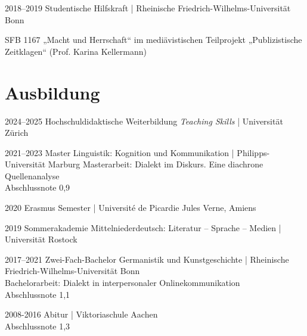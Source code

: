 \documentclass[11pt, a4paper, notopicbreak, titleabove]{simplecv}
\begin{document}
\begin{topic}
	\item[2018--2019]
		Studentische Hilfskraft {\color{SpotColor}|} Rheinische Friedrich-Wilhelms-Universität Bonn  \par
		\begingroup
			\color{QueenslandGrey}\small%
			\selectfont%
			SFB 1167 „Macht und Herrschaft“ im mediävistischen Teilprojekt „Publizistische Zeitklagen“ (Prof. Karina Kellermann)\\  
		\endgroup
\end{topic}


\section{Ausbildung}

\begin{topic}

	\item[2024--2025]
		Hochschuldidaktische Weiterbildung \textit{Teaching Skills} {\color{SpotColor}|} Universität Zürich \par
		\begingroup
			\color{QueenslandGrey}\small%
		
		\endgroup


	\item[2021--2023]
		Master Linguistik: Kognition und Kommunikation  {\color{SpotColor}|} Philipps-Universität Marburg
		\begingroup
			\color{QueenslandGrey}\small%
			\selectfont%
			Masterarbeit: Dialekt im Diskurs. Eine diachrone Quellenanalyse \\
			Abschlussnote 0,9 \\  
		\endgroup
	\item[2020]
		Erasmus Semester {\color{SpotColor}|} Université de Picardie Jules Verne, Amiens		
	
	\item[2019]
		Sommerakademie Mittelniederdeutsch: Literatur – Sprache – Medien {\color{SpotColor}|} Universität Rostock
	\item[2017--2021]
		Zwei-Fach-Bachelor Germanistik und Kunstgeschichte {\color{SpotColor}|} Rheinische Friedrich-Wilhelms-Universität Bonn \\
		\begingroup
			\color{QueenslandGrey}\small%
			\selectfont%
			Bachelorarbeit: Dialekt in interpersonaler Onlinekommunikation \\ 
			Abschlussnote 1,1 \\ 
		\endgroup
	\item[2008-2016]
		Abitur {\color{SpotColor}|} Viktoriaschule Aachen \\
		\begingroup
			\color{QueenslandGrey}\small%
			\selectfont%
			Abschlussnote 1,3 \\  
		\endgroup
\end{topic}
\end{document}
